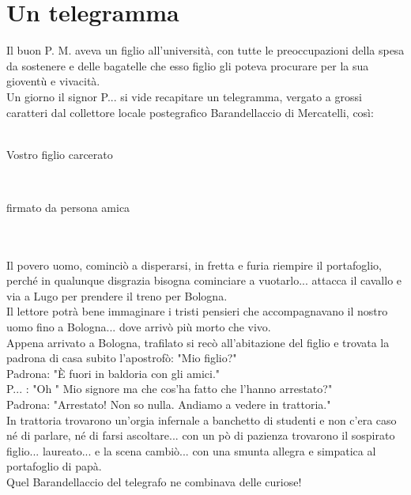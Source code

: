 \documentclass[10pt]{memoir} %
\begin{document}
\chapter{Un telegramma}
Il buon P. M. aveva un figlio all'università, con tutte le preoccupazioni della spesa da sostenere e delle bagatelle che esso figlio gli poteva procurare per la sua gioventù e vivacità.\\
Un giorno il signor P.\:.\:.\: si vide recapitare un telegramma, vergato a grossi caratteri dal collettore locale postegrafico Barandellaccio di Mercatelli, così:\\ \textcal \Huge\\
\centerline {Vostro figlio carcerato}\\
\centerline {firmato da persona amica}\\ \normalfont \normalsize \\
Il povero uomo, cominciò a disperarsi, in fretta e furia riempire il portafoglio, perché in qualunque disgrazia bisogna cominciare a vuotarlo... attacca il cavallo e via a Lugo per prendere il treno per Bologna.\\
Il lettore potrà bene immaginare i tristi pensieri che accompagnavano il nostro uomo fino a Bologna... dove arrivò più morto che vivo.\\
Appena arrivato a Bologna, trafilato si recò all'abitazione del figlio e trovata la padrona di casa subito l'apostrofò: "Mio figlio?"\\
Padrona: "È fuori in baldoria con gli amici."\\
P.\:.\:.\: : "Oh " Mio signore ma che cos'ha fatto che l'hanno arrestato?"\\
Padrona: "Arrestato! Non so nulla. Andiamo a vedere in trattoria."\\
In trattoria trovarono un'orgia infernale a banchetto di studenti e non c'era caso né di parlare, né di farsi ascoltare... con un pò di pazienza trovarono il sospirato figlio... laureato... e la scena cambiò... con una smunta allegra e simpatica al portafoglio di papà.\\
Quel Barandellaccio del telegrafo ne combinava delle curiose!

\end{document}
